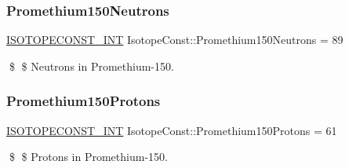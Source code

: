 \subsubsection{\texorpdfstring{Promethium150\+Neutrons}{Promethium150Neutrons}}
{\footnotesize\ttfamily \mbox{\hyperlink{group___isotope_const-_macros_ga5f18360b3e99483a35c32d789e62621c}{I\+S\+O\+T\+O\+P\+E\+C\+O\+N\+S\+T\+\_\+\+I\+NT}} Isotope\+Const\+::\+Promethium150\+Neutrons = 89}

\$ \$ Neutrons in Promethium-\/150. \mbox{\label{group___isotope_const-_promethium-_pm150_gafb2e4a67415188d40fc24b26c4e8c728}} 
\subsubsection{\texorpdfstring{Promethium150\+Protons}{Promethium150Protons}}
{\footnotesize\ttfamily \mbox{\hyperlink{group___isotope_const-_macros_ga5f18360b3e99483a35c32d789e62621c}{I\+S\+O\+T\+O\+P\+E\+C\+O\+N\+S\+T\+\_\+\+I\+NT}} Isotope\+Const\+::\+Promethium150\+Protons = 61}

\$ \$ Protons in Promethium-\/150. 